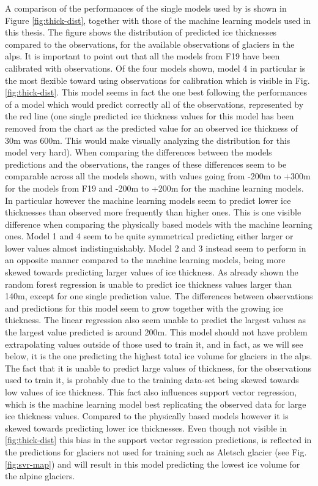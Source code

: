 A comparison of the performances of the single models used by \citet{Farinotti2019} is shown in Figure \ref{fig:thick-dist}, together with those of the machine learning models used in this thesis. The figure shows the distribution of predicted ice thicknesses compared to the observations, for the available observations of glaciers in the alps. It is important to point out that all the models from F19 have been calibrated with observations. Of the four models shown, model 4 in particular is the most flexible toward using observations for calibration which is visible in Fig. \ref{fig:thick-dist}. This model seems in fact the one best following the performances of a model which would predict correctly all of the observations, represented by the red line (one single predicted ice thickness values for this model has been removed from the chart as the predicted value for an observed ice thickness of 30m was 600m. This would make visually analyzing the distribution for this model very hard). When comparing the differences between the models predictions and the observations, the ranges of these differences seem to be comparable across all the models shown, with values going from -200m to +300m for the models from F19 and -200m to +200m for the machine learning models. In particular however the machine learning models seem to predict lower ice thicknesses than observed more frequently than higher ones. This is one visible difference when comparing the physically based models with the machine learning ones. Model 1 and 4 seem to be quite symmetrical predicting either larger or lower values almost indistinguishably. Model 2 and 3 instead seem to perform in an opposite manner compared to the machine learning models, being more skewed towards predicting larger values of ice thickness. As already shown the random forest regression is unable to predict ice thickness values larger than 140m, except for one single prediction value. The differences between observations and predictions for this model seem to grow together with the growing ice thickness. The linear regression also seem unable to predict the largest values as the largest value predicted is around 200m. This model should not have problem extrapolating values outside of those used to train it, and in fact, as we will see below, it is the one predicting the highest total ice volume for glaciers in the alps. The fact that it is unable to predict large values of thickness, for the observations used to train it, is probably due to the training data-set being skewed towards low values of ice thickness. This fact also influences support vector regression, which is the machine learning model best replicating the observed data for large ice thickness values. Compared to the physically based models however it is skewed towards predicting lower ice thicknesses. Even though not visible in \ref{fig:thick-dist} this bias in the support vector regression predictions, is reflected in the predictions for glaciers not used for training such as Aletsch glacier (see Fig. \ref{fig:svr-map}) and will result in this model predicting the lowest ice volume for the alpine glaciers.

